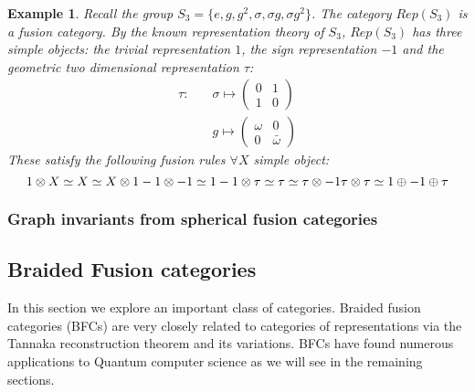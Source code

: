 \documentclass{article}
\newtheorem{example}{Example}
\begin{document}
\begin{example}
Recall the group $S_3=\{e, g, g^2, \sigma, \sigma g, \sigma g^2 \}$. The category $Rep(S_3)$ is a fusion category. By the known representation theory of $S_3$, $Rep(S_3)$ has three simple objects: the trivial representation $1$, the sign representation $-1$ and the geometric two dimensional representation $\tau$:
\begin{equation*}
\begin{split}
    \tau : \quad & \sigma \mapsto \left( {\begin{array}{cc} 0 & 1 \\ 1 & 0 \end{array}}\right) \\
     & g \mapsto \left( {\begin{array}{cc} \omega & 0 \\ 0 & \bar{\omega} \end{array}}\right)
\end{split}
\end{equation*}
These satisfy the following fusion rules $\forall X$ simple object:
\begin{equation}
        1 \otimes X \simeq X \simeq X \otimes 1\\
        -1 \otimes -1 \simeq 1\\
        -1 \otimes \tau \simeq \tau \simeq \tau \otimes -1\\
        \tau \otimes \tau \simeq 1 \oplus -1 \oplus \tau\\
\end{equation}

\end{example}

\subsubsection{Graph invariants from spherical fusion categories}

\subsection{Braided Fusion categories}
In this section we explore an important class of categories. Braided fusion categories (BFCs) are very closely related to categories of representations via the Tannaka reconstruction theorem and its variations. BFCs have found numerous applications to Quantum computer science as we will see in the remaining sections.
\end{document}

